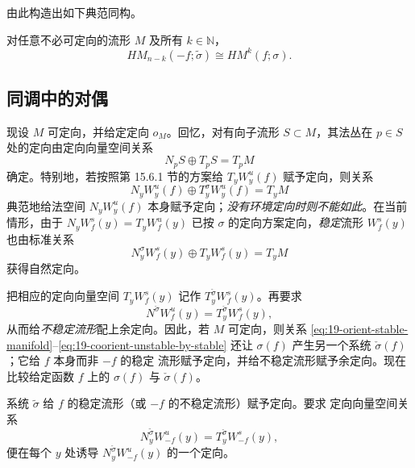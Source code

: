 由此构造出如下典范同构。

\begin{corollary}[时间反演]
\label{cor:morse-time-reversal-duality}
对任意不必可定向的流形 $M$ 及所有 $k\in\mathbb N$，
\begin{equation}
 HM_{n-k}(-f;\widetilde\sigma)\cong HM^k(f;\sigma).
\label{eq:19-morse-time-reversal-duality}
\end{equation}
\end{corollary}

\subsection{\personMorse{}同调中的\personPoincare{}对偶}
\label{subsec:poincare-duality-morse-homology}

现设 $M$ 可定向，并给定定向 $o_M$。回忆，对有向子流形 $S\subset M$，其法丛在
$p\in S$ 处的定向由定向向量空间关系
\begin{equation}
 N_pS\oplus T_pS=T_pM
\label{eq:19-normal-tangent-ambient-orientation}
\end{equation}
确定。特别地，若按照第 15.6.1 节的方案给 $T_yW_y^u(f)$ 赋予定向，则关系
\[
 N_yW_y^u(f)\oplus T_y^\sigma W_y^u(f)=T_yM
\]
典范地给法空间 $N_yW_y^u(f)$ 本身赋予定向；\emph{没有环境定向时则不能如此}。在当前
情形，由于 $N_yW_f^s(y)=T_yW_f^u(y)$ 已按 $\sigma$ 的定向方案定向，\emph{稳定}流形
$W_f^s(y)$ 也由标准关系
\begin{equation}
 N_y^\sigma W_f^s(y)\oplus T_yW_f^s(y)=T_yM
\label{eq:19-orient-stable-manifold}
\end{equation}
获得自然定向。

把相应的定向向量空间 $T_yW_f^s(y)$ 记作 $T_y^{\check\sigma}W_f^s(y)$。再要求
\begin{equation}
 N^{\check\sigma}W_f^u(y)=T_y^{\check\sigma}W_f^s(y),
\label{eq:19-coorient-unstable-by-stable}
\end{equation}
从而给\emph{不稳定流形}配上余定向。因此，若 $M$ 可定向，则关系
\eqref{eq:19-orient-stable-manifold}--\eqref{eq:19-coorient-unstable-by-stable}
还让 $\sigma(f)$ 产生另一个系统 $\check\sigma(f)$；它给 $f$ 本身而非 $-f$ 的稳定
流形赋予定向，并给不稳定流形赋予余定向。现在比较给定\personMorse{}函数 $f$ 上的
$\sigma(f)$ 与 $\check\sigma(f)$。

系统 $\widetilde\sigma$ 给 $f$ 的稳定流形（或 $-f$ 的不稳定流形）赋予定向。要求
定向向量空间关系
\[
 N_y^{\widetilde\sigma}W_{-f}^u(y)=T_y^{\check\sigma}W_{-f}^s(y),
\]
便在每个 $y$ 处诱导 $N_y^{\check\sigma}W_{-f}^u(y)$ 的一个定向。

